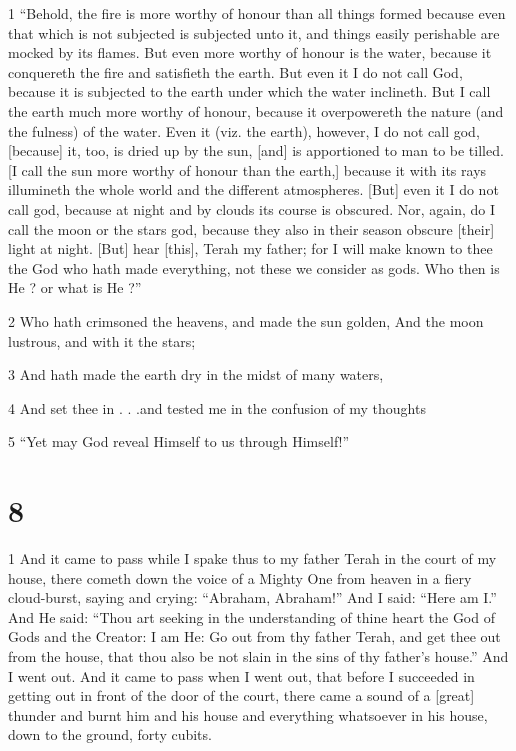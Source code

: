 \par 1 “Behold, the fire is more worthy of honour than all things formed because even that which is not subjected is subjected unto it, and things easily perishable are mocked by its flames. But even more worthy of honour is the water, because it conquereth the fire and satisfieth the earth. But even it I do not call God, because it is subjected to the earth under which the water inclineth. But I call the earth much more worthy of honour, because it overpowereth the nature (and the fulness) of the water. Even it (viz. the earth), however, I do not call god, [because] it, too, is dried up by the sun, [and] is apportioned to man to be tilled. [I call the sun more worthy of honour than the earth,] because it with its rays illumineth the whole world and the different atmospheres. [But] even it I do not call god, because at night and by clouds its course is obscured. Nor, again, do I call the moon or the stars god, because they also in their season obscure [their] light at night. [But] hear [this], Terah my father; for I will make known to thee the God who hath made everything, not these we consider as gods. Who then is He ? or what is He ?”

\par 2 Who hath crimsoned the heavens, and made the sun golden, And the moon lustrous, and with it the stars;

\par 3 And hath made the earth dry in the midst of many waters,

\par 4 And set thee in . . .and tested me in the confusion of my thoughts

\par 5 “Yet may God reveal Himself to us through Himself!”

\chapter{8}

\par 1 And it came to pass while I spake thus to my father Terah in the court of my house, there cometh down the voice of a Mighty One from heaven in a fiery cloud-burst, saying and crying: “Abraham, Abraham!” And I said: “Here am I.” And He said: “Thou art seeking in the understanding of thine heart the God of Gods and the Creator: I am He: Go out from thy father Terah, and get thee out from the house, that thou also be not slain in the sins of thy father's house.” And I went out. And it came to pass when I went out, that before I succeeded in getting out in front of the door of the court, there came a sound of a [great] thunder and burnt him and his house and everything whatsoever in his house, down to the ground, forty cubits. 


